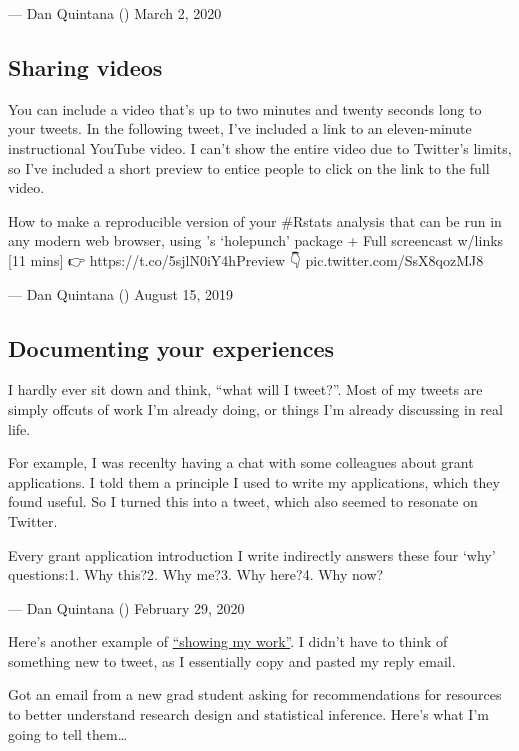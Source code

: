 \documentclass[]{book}
\begin{document}
--- Dan Quintana (\citet{dsquintana}) March 2, 2020

\hypertarget{sharing-videos}{%
\subsection{Sharing videos}\label{sharing-videos}}

You can include a video that's up to two minutes and twenty seconds long to your tweets. In the following tweet, I've included a link to an eleven-minute instructional YouTube video. I can't show the entire video due to Twitter's limits, so I've included a short preview to entice people to click on the link to the full video.

How to make a reproducible version of your \#Rstats analysis that can be run in any modern web browser, using \citet{_inundata}'s `holepunch' package + \citet{mybinderteam} Full screencast w/links {[}11 mins{]} 👉 https://t.co/5sjlN0iY4hPreview 👇 pic.twitter.com/SsX8qozMJ8

--- Dan Quintana (\citet{dsquintana}) August 15, 2019

\hypertarget{documenting-your-experiences}{%
\subsection{Documenting your experiences}\label{documenting-your-experiences}}

I hardly ever sit down and think, ``what will I tweet?''. Most of my tweets are simply offcuts of work I'm already doing, or things I'm already discussing in real life.

For example, I was recenlty having a chat with some colleagues about grant applications. I told them a principle I used to write my applications, which they found useful. So I turned this into a tweet, which also seemed to resonate on Twitter.

Every grant application introduction I write indirectly answers these four `why' questions:1. Why this?2. Why me?3. Why here?4. Why now?

--- Dan Quintana (\citet{dsquintana}) February 29, 2020

Here's another example of \href{https://austinkleon.com/show-your-work/}{``showing my work''}. I didn't have to think of something new to tweet, as I essentially copy and pasted my reply email.

Got an email from a new grad student asking for recommendations for resources to better understand research design and statistical inference. Here's what I'm going to tell them\ldots{}
\end{document}
